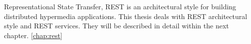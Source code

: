 Representational State Transfer, REST is an architectural style for building distributed hypermedia applications. This thesis deals with REST architectural style and REST services. They will be described in detail within the next chapter. \ref{chap:rest}



    
